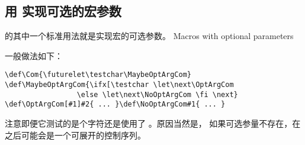 \documentclass{book}
\begin{document}
\subsection{用 \protect{} 实现可选的宏参数}

 的其中一个标准用法就是实现宏的可选参数。
\howto Macros with optional parameters\par
一般做法如下：
\begin{verbatim}
\def\Com{\futurelet\testchar\MaybeOptArgCom}
\def\MaybeOptArgCom{\ifx[\testchar \let\next\OptArgCom 
                 \else \let\next\NoOptArgCom \fi \next}
\def\OptArgCom[#1]#2{ ... }\def\NoOptArgCom#1{ ... }
\end{verbatim}
注意即便它测试的是个字符还是使用了 。原因当然是，
如果可选参量不存在，在  之后可能会是一个可展开的控制序列。
\end{document}
